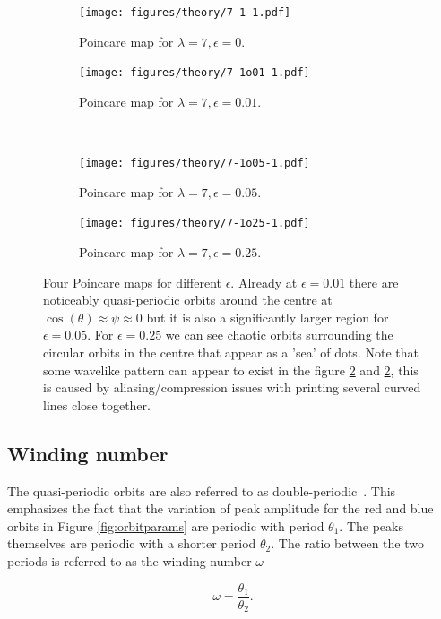 \begin{figure}[H]
\centering
\begin{subfigure}[3a]{0.40\textwidth}
\texttt{[image: figures/theory/7-1-1.pdf]}
\caption{Poincare map for $\lambda = 7, \epsilon = 0$.}\label{fig:orbitmap1}
\end{subfigure}\hspace{1em}%
\begin{subfigure}[3b]{0.40\textwidth}
\texttt{[image: figures/theory/7-1o01-1.pdf]}
\caption{Poincare map for $\lambda = 7, \epsilon = 0.01$.}\label{fig:orbitmap2}
\end{subfigure} \\
\begin{subfigure}[3a]{0.40\textwidth}
\texttt{[image: figures/theory/7-1o05-1.pdf]}
\caption{Poincare map for $\lambda = 7, \epsilon = 0.05$.}\label{fig:orbitmap3}
\end{subfigure}\hspace{1em}%
	\begin{subfigure}[3b]{0.40\textwidth}
\texttt{[image: figures/theory/7-1o25-1.pdf]}
\caption{Poincare map for $\lambda = 7, \epsilon = 0.25$.}\label{fig:orbitmap4}
\end{subfigure} 
\caption{Four Poincare maps for different $\epsilon$. Already at $\epsilon = 0.01$ there are noticeably quasi-periodic 
orbits around the centre at $\cos(\theta) \approx \psi \approx 0$ but it is also a significantly larger region for $\epsilon = 0.05$. For $\epsilon = 0.25$ we can see chaotic orbits surrounding the circular orbits in the centre that appear as a 'sea' of dots. Note that some wavelike pattern can appear to exist in the figure \ref{fig:orbitmap2} and  \ref{fig:orbitmap2}, this is caused by aliasing/compression issues with printing several curved lines close together.}\label{fig:orbitmaps}
\end{figure}

\subsection{Winding number} \label{sec:winding}
The quasi-periodic orbits are also referred to as double-periodic~\cite{Yarin}. This emphasizes the fact that the variation of peak amplitude for the red and blue orbits in Figure \ref{fig:orbitparams} are periodic with period $\theta_1$. The peaks themselves are periodic with a shorter period $\theta_2$. The ratio between the two periods is referred to as the winding number $\omega$

\begin{equation}\label{eq:winding}
\omega = \frac{\theta_1}{\theta_2}.
\end{equation}

